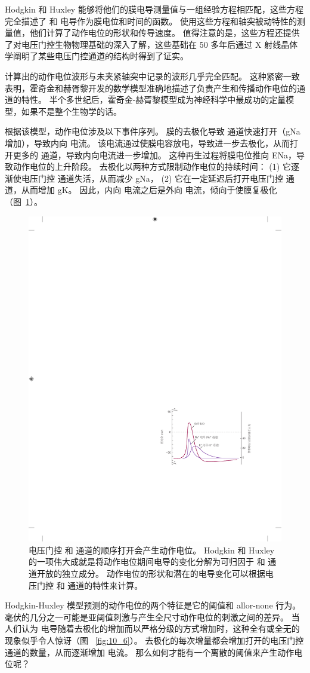 Hodgkin 和 Huxley 能够将他们的膜电导测量值与一组经验方程相匹配，这些方程完全描述了  和  电导作为膜电位和时间的函数。
使用这些方程和轴突被动特性的测量值，他们计算了动作电位的形状和传导速度。
值得注意的是，这些方程还提供了对电压门控生物物理基础的深入了解，这些基础在 50 多年后通过 X 射线晶体学阐明了某些电压门控通道的结构时得到了证实。


计算出的动作电位波形与未夹紧轴突中记录的波形几乎完全匹配。
这种紧密一致表明，霍奇金和赫胥黎开发的数学模型准确地描述了负责产生和传播动作电位的通道的特性。
半个多世纪后，霍奇金-赫胥黎模型成为神经科学中最成功的定量模型，如果不是整个生物学的话。


根据该模型，动作电位涉及以下事件序列。
膜的去极化导致  通道快速打开（gNa 增加），导致内向  电流。
该电流通过使膜电容放电，导致进一步去极化，从而打开更多的  通道，导致内向电流进一步增加。 
这种再生过程将膜电位推向 ENa，导致动作电位的上升阶段。
去极化以两种方式限制动作电位的持续时间：
(1) 它逐渐使电压门控  通道失活，从而减少 gNa，
(2) 它在一定延迟后打开电压门控  通道，从而增加 gK。
因此，内向  电流之后是外向  电流，倾向于使膜复极化（图~\ref{fig:10_7}）。


\begin{figure}[htbp]
	\centering
	\includegraphics[width=0.5\linewidth]{chap10/fig_10_7}
	\caption{电压门控  和  通道的顺序打开会产生动作电位。
		Hodgkin 和 Huxley 的一项伟大成就是将动作电位期间电导的变化分解为可归因于  和  通道开放的独立成分。
		动作电位的形状和潜在的电导变化可以根据电压门控  和  通道的特性来计算\cite{hille1978ionic}。}
	\label{fig:10_7}
\end{figure}


Hodgkin-Huxley 模型预测的动作电位的两个特征是它的阈值和 allor-none 行为。
毫伏的几分之一可能是亚阈值刺激与产生全尺寸动作电位的刺激之间的差异。
当人们认为  电导随着去极化的增加而以严格分级的方式增加时，这种全有或全无的现象似乎令人惊讶（图 ~\ref{fig:10_6}）。 
去极化的每次增量都会增加打开的电压门控  通道的数量，从而逐渐增加  电流。
那么如何才能有一个离散的阈值来产生动作电位呢？


